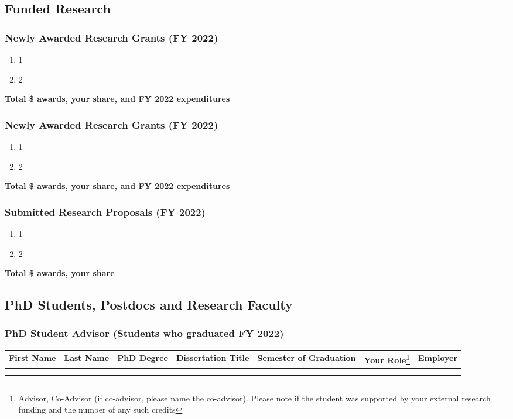 \documentclass[11pt]{article}
\newcommand{\fy}{2022}
\begin{document}
\subsection{Funded Research}
\subsubsection{Newly Awarded Research Grants (FY \fy{})}
\begin{enumerate}
\item 1
\item 2
\end{enumerate}
\textbf{Total \$ awards, your share, and FY \fy{} expenditures}


\subsubsection{Newly Awarded Research Grants (FY \fy{})}
\begin{enumerate}
\item 1
\item 2
\end{enumerate}
\textbf{Total \$ awards, your share, and FY \fy{} expenditures}


\subsubsection{Submitted Research Proposals (FY \fy{})}
\begin{enumerate}
\item 1
\item 2
\end{enumerate}
\textbf{Total \$ awards, your share}


\subsection{PhD Students, Postdocs and Research Faculty}


\subsubsection{PhD Student Advisor (Students who graduated FY \fy{})}

\begin{minipage}{\textwidth}
  \footnotesize
  \centering
  \begin{tabular}{ccccccc}
    \toprule
    First Name& Last Name& PhD Degree& Dissertation Title& Semester of Graduation& Your Role\footnote{Advisor, Co-Advisor (if co-advisor, please name the co-advisor). Please note if the student was supported by your external research
funding and the number of any such credits}& Employer\\
    \midrule
              &&&&&\\
              &&&&&
  \end{tabular}
\end{minipage}
\end{document}
